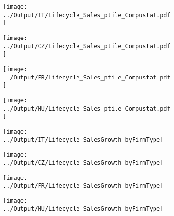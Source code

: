 \documentclass[12pt,notitlepage]{article}
\begin{document}
\begin{figure}[!htpb]
\centering
\caption{Sales (Percentile)}
\begin{subfigure}{.49\textwidth}
    \centering
 \texttt{[image: ../Output/IT/Lifecycle\_Sales\_ptile\_Compustat.pdf]}
\end{subfigure}%
\begin{subfigure}{.49\textwidth}
    \centering
 \texttt{[image: ../Output/CZ/Lifecycle\_Sales\_ptile\_Compustat.pdf]}
\end{subfigure}
\begin{subfigure}{.49\textwidth}
    \centering
 \texttt{[image: ../Output/FR/Lifecycle\_Sales\_ptile\_Compustat.pdf]}
\end{subfigure}%
\begin{subfigure}{.49\textwidth}
    \centering
 \texttt{[image: ../Output/HU/Lifecycle\_Sales\_ptile\_Compustat.pdf]}
\end{subfigure}
\end{figure}
\pagebreak


\begin{figure}[!htpb]
\centering
\caption{Sales (Average)}
\begin{subfigure}{.49\textwidth}
    \centering
 \texttt{[image: ../Output/IT/Lifecycle\_SalesGrowth\_byFirmType]}
\end{subfigure}%
\begin{subfigure}{.49\textwidth}
    \centering
 \texttt{[image: ../Output/CZ/Lifecycle\_SalesGrowth\_byFirmType]}
\end{subfigure}
\begin{subfigure}{.49\textwidth}
    \centering
 \texttt{[image: ../Output/FR/Lifecycle\_SalesGrowth\_byFirmType]}
\end{subfigure}%
\begin{subfigure}{.49\textwidth}
    \centering
 \texttt{[image: ../Output/HU/Lifecycle\_SalesGrowth\_byFirmType]}
\end{subfigure}
\end{figure}
\pagebreak
\end{document}

